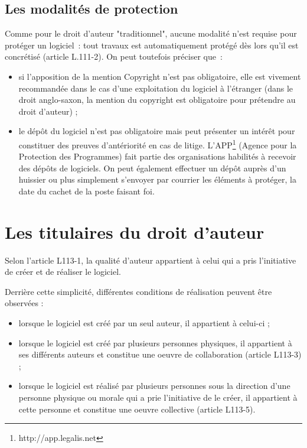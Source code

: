 \documentclass{report}
\begin{document}
\subsection{Les modalités de protection}
Comme pour le droit d'auteur "traditionnel", aucune modalité n'est requise pour protéger un logiciel~: tout travaux est automatiquement protégé dès lors qu'il est concrétisé (article L.111-2). On peut toutefois préciser que~:
\begin{itemize}
\item si l'apposition de la mention Copyright n'est pas obligatoire, elle est vivement recommandée dans le cas d'une exploitation du logiciel à l'étranger (dans le droit anglo-saxon, la mention du copyright est obligatoire pour prétendre au droit d'auteur) ;
\item le dépôt du logiciel n'est pas obligatoire mais peut présenter un intérêt pour constituer des preuves d'antériorité en cas de litige. L'APP\footnote{http://app.legalis.net} (Agence pour la Protection des Programmes) fait partie des organisations habilités à recevoir des dépôts de logiciels. On peut également effectuer un dépôt auprès d'un huissier ou plus simplement s'envoyer par courrier les éléments à protéger, la date du cachet de la poste faisant foi.
\end{itemize}

\section{Les titulaires du droit d'auteur}
Selon l'article L113-1, la qualité d'auteur appartient à celui qui a pris l'initiative de créer et de réaliser le logiciel.

Derrière cette simplicité, différentes conditions de réalisation peuvent être observées :
\begin{itemize}
\item lorsque le logiciel est créé par un seul auteur, il appartient à celui-ci ;
\item lorsque le logiciel est créé par plusieurs personnes physiques, il appartient à ses différents auteurs et constitue une oeuvre de collaboration (article L113-3) ;
\item lorsque le logiciel est réalisé par plusieurs personnes sous la direction d'une personne physique ou morale qui a prie l'initiative de le créer, il appartient à cette personne et constitue une oeuvre collective (article L113-5).
\end{itemize}
\end{document}
